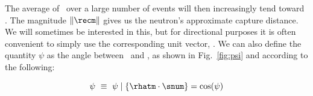 The average of \rhat\ over a large number of events will then increasingly tend toward \snu.
The magnitude $\| \recm \|$ gives us the neutron's approximate capture distance.
We will sometimes be interested in this, but for directional purposes it is often convenient to simply use the corresponding unit vector, \rhat.
We can also define the quantity $\psi$ as the angle between \rhat\ and \snu, as shown in Fig.~\ref{fig:psi} and according to the following:

\begin{equation}
  \psi\ \equiv\ \psi \mid \{ \rhatm \cdot \snum \} = \cos(\psi)
\end{equation}

%


